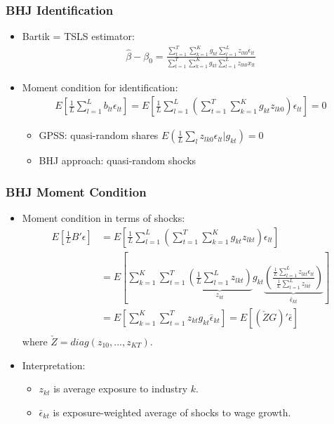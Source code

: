 \documentclass[english,xcolor=svgnames]{beamer}
\begin{document}
\begin{frame}
\frametitle[alignment=center]{BHJ Identification}
\begin{itemize}
	\item Bartik = TSLS estimator:
	\begin{align*}
		\hat{\beta} - \beta_0 = \frac{\sum_{t=1}^{T}\sum_{k=1}^K g_{kt} \sum_{l=1}^{L}z_{lk0} \epsilon_{lt}}{\sum_{t=1}^{T}\sum_{k=1}^K g_{kt} \sum_{l=1}^{L}z_{lk0} x_{lt}}
	\end{align*}
	\item Moment condition for identification:
	\begin{align*}
		E\left[\frac{1}{L}\sum_{l=1}^{L}b_{lt} \epsilon_{lt}\right] = E\left[\frac{1}{L}\sum_{l=1}^{L}\left(\sum_{t=1}^{T}\sum_{k=1}^K  g_{kt}z_{lk0}\right) \epsilon_{lt}\right] = 0
	\end{align*}
	\begin{itemize}
		\item GPSS: quasi-random shares $E(\frac{1}{L}\sum_{l}z_{lk0}\epsilon_{lt}|g_{kt})=0$
		\item BHJ approach: quasi-random shocks %
	\end{itemize}
\end{itemize}
\end{frame}


\begin{frame}
\frametitle[alignment=center]{BHJ Moment Condition}
\begin{itemize}
	\item Moment condition in terms of shocks:
	\begin{align*}
		E\left[\frac{1}{L}B'\epsilon \right] &=  E\left[\frac{1}{L}\sum_{l=1}^{L}\left(\sum_{t=1}^{T}\sum_{k=1}^K  g_{kt}z_{lkt}\right) \epsilon_{lt}\right] \\
		&=E\left[\sum_{k=1}^K \sum_{t=1}^{T}  \underbrace{\left(\frac{1}{L}\sum_{l=1}^{L}z_{lkt}\right)}_{z_{kt}}   g_{kt}   \underbrace{\left(\frac{\frac{1}{L}\sum_{l=1}^{L}z_{lkt}\epsilon_{lt}}{\frac{1}{L}\sum_{l=1}^{L}z_{lkt}}\right)}_{\bar{\epsilon}_{kt}}  \right] \\
		&=E\left[\sum_{k=1}^K \sum_{t=1}^{T} z_{kt}    g_{kt} \bar{\epsilon}_{kt} \right] = E\left[(\check{Z}  G)' \bar{\epsilon} \right] \\
	\end{align*}
	where $\check{Z} = diag(z_{10},...,z_{KT})$.
	\item Interpretation:
	\begin{itemize}
		\item $z_{kt}$ is average exposure to industry $k$.
		\item $\bar{\epsilon}_{kt}$ is exposure-weighted average of shocks to wage growth.
	\end{itemize}
\end{itemize}
\end{frame}
\end{document}
